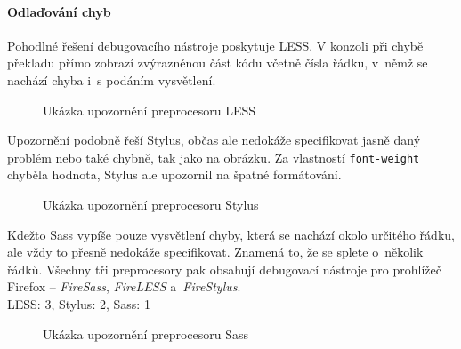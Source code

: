\documentclass[thesis=B,czech]{FITthesis}[2012/06/26]
\begin{document}
\paragraph{Odlaďování chyb}

Pohodlné řešení debugovacího nástroje poskytuje LESS. V konzoli při chybě překladu přímo zobrazí zvýrazněnou část kódu včetně čísla řádku, v~němž se nachází chyba i~s podáním vysvětlení. 

\begin{figure}[htb]
	\begin{center}
	\end{center}
	\caption{Ukázka upozornění preprocesoru LESS}
	\label{imgLESS1}
\end{figure}
Upozornění podobně řeší Stylus, občas ale nedokáže specifikovat jasně daný problém nebo také chybně, tak jako na obrázku. Za vlastností \verb#font-weight# chyběla hodnota, Stylus ale upozornil na špatné formátování.
\begin{figure}[h]
	\begin{center}
	\end{center}
	\caption{Ukázka upozornění preprocesoru Stylus}
	\label{imgSass1}
\end{figure}

Kdežto \gls{Sass} vypíše pouze vysvětlení chyby, která se nachází okolo určitého řádku, ale vždy to přesně nedokáže specifikovat. Znamená to, že se splete o~několik řádků. Všechny tři preprocesory pak obsahují debugovací nástroje pro prohlížeč Firefox -- \textit{FireSass}, \textit{FireLESS} a~\textit{FireStylus}.\\
LESS: 3, Stylus: 2, \gls{Sass}: 1

\begin{figure}[h]
	\begin{center}
	\end{center}
	\caption{Ukázka upozornění preprocesoru Sass}
	\label{imgStyl1}
\end{figure}
\end{document}
